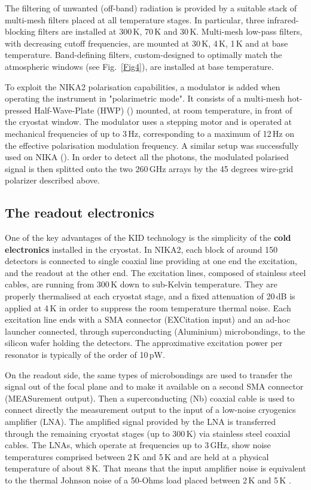 \documentclass[]{aa} %
\begin{document}
The filtering of unwanted (off-band) radiation is provided by a suitable stack of multi-mesh filters placed at all temperature stages. In particular, three infrared-blocking filters are installed at 300\,K, 70\,K and 30\,K. Multi-mesh low-pass filters, with decreasing cutoff frequencies, are mounted at 30\,K, 4\,K, 1\,K and at base temperature. Band-defining filters, custom-designed to optimally match the atmospheric windows (see Fig.~\ref{Fig4}), are installed at base temperature. 

To exploit the NIKA2 polarisation capabilities, a modulator is added when operating the instrument in "polarimetric mode". It consists of a multi-mesh hot-pressed Half-Wave-Plate (HWP) (\cite{Pisano2008}) mounted, at room temperature, in front of the cryostat window. The modulator uses a stepping motor and is operated at mechanical frequencies of up to 3\,Hz, corresponding to a maximum of 12\,Hz on the effective polarisation modulation frequency. A similar setup was successfully used on NIKA (\cite{Ritacco2017}). In order to detect all the photons, the modulated polarised signal is then splitted onto the two 260\,GHz arrays by the 45 degrees wire-grid polarizer described above.  


 \subsection{The readout electronics}

One of the key advantages of the KID technology is the simplicity of the {\bf{cold electronics}} installed in the cryostat.
In NIKA2, each block of around 150 detectors is connected to single coaxial line providing at one end the excitation, and the readout at the other end. The excitation lines, composed of stainless steel cables, are running from 300\,K down to sub-Kelvin temperature. They are properly thermalised at each cryostat stage, and a fixed attenuation of 20\,dB is applied at 4\,K in order to suppress the room temperature thermal noise. Each excitation line ends with a SMA connector (EXCitation input) and an ad-hoc launcher connected, through superconducting (Aluminium) microbondings, to the silicon wafer holding the detectors. The approximative excitation power per resonator is typically of the order of 10\,pW.

On the readout side, the same types of microbondings are used to transfer the signal out of the focal plane and to make it available on a second SMA connector (MEASurement output). Then a superconducting (Nb) coaxial cable is used to connect directly the measurement output to the input of a low-noise cryogenics amplifier (LNA). The amplified signal provided by the LNA is transferred through the remaining cryostat stages (up to 300\,K) via stainless steel coaxial cables. The LNAs, which operate at frequencies up to 3\,GHz, show noise temperatures comprised between 2\,K and 5\,K and are held at a physical temperature of about 8\,K. That means that the input amplifier noise is equivalent to the thermal Johnson noise of a 50-Ohms load placed between 2\,K and 5\,K .
\end{document}
